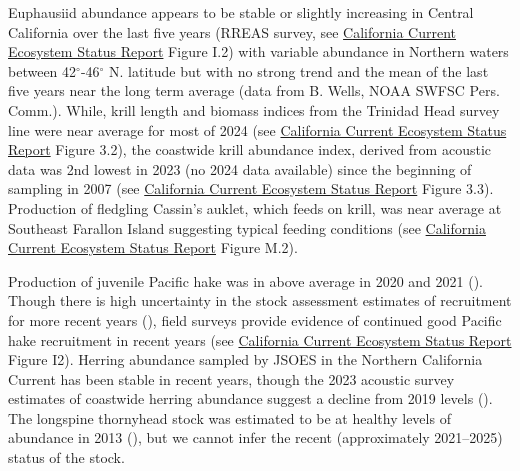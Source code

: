 \documentclass[
  english,
]{article}
\begin{document}
Euphausiid abundance appears to be stable or slightly increasing in
Central California over the last five years (RREAS survey, see
\href{https://www.pcouncil.org/documents/2025/02/f-1-a-cciea-report-1-2024-2025-california-current-ecosystem-status-report.pdf/}{California
Current Ecosystem Status Report} Figure I.2) with variable abundance in
Northern waters between 42\(^\circ\)-46\(^\circ\) N. latitude but with
no strong trend and the mean of the last five years near the long term
average (data from B. Wells, NOAA SWFSC Pers. Comm.). While, krill
length and biomass indices from the Trinidad Head survey line were near
average for most of 2024 (see
\href{https://www.pcouncil.org/documents/2025/02/f-1-a-cciea-report-1-2024-2025-california-current-ecosystem-status-report.pdf/}{California
Current Ecosystem Status Report} Figure 3.2), the coastwide krill
abundance index, derived from acoustic data was 2nd lowest in 2023 (no
2024 data available) since the beginning of sampling in 2007 (see
\href{https://www.pcouncil.org/documents/2024/02/agenda-item-h-1-a-cciea-team-report-1-2023-2024-california-current-ecosystem-status-report-electronic-only.pdf/}{California
Current Ecosystem Status Report} Figure 3.3). Production of fledgling
Cassin's auklet, which feeds on krill, was near average at Southeast
Farallon Island suggesting typical feeding conditions (see
\href{https://www.pcouncil.org/documents/2025/02/f-1-a-cciea-report-1-2024-2025-california-current-ecosystem-status-report.pdf/}{California
Current Ecosystem Status Report} Figure M.2).

Production of juvenile Pacific hake was in above average in 2020 and
2021 (). Though there is high
uncertainty in the stock assessment estimates of recruitment for more
recent years (), field
surveys provide evidence of continued good Pacific hake recruitment in
recent years (see
\href{https://www.pcouncil.org/documents/2025/02/f-1-a-cciea-report-1-2024-2025-california-current-ecosystem-status-report.pdf/}{California
Current Ecosystem Status Report} Figure I2). Herring abundance sampled
by JSOES in the Northern California Current has been stable in recent
years, though the 2023 acoustic survey estimates of coastwide herring
abundance suggest a decline from 2019 levels
(). The
longspine thornyhead stock was estimated to be at healthy levels of
abundance in 2013 (), but we cannot infer the recent (approximately 2021--2025) status
of the stock.
\end{document}
